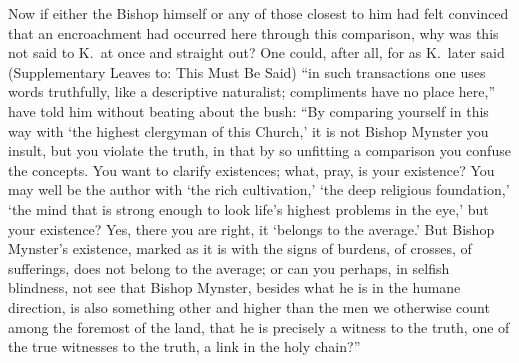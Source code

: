\documentclass[12pt,a4paper]{article}
\newcommand{\opage}[1]{\marginnote{\footnotesize\textit{[#1]}}}
\begin{document}
Now if either the Bishop himself or any of those closest to him had felt
convinced that an encroachment had occurred here through this
comparison, why was this not said to K.\ at once and straight out? One
could, after all, for as K.\ later said (Supplementary Leaves to: This Must Be
Said) ``in such transactions one uses words truthfully, like a
descriptive naturalist; compliments have no place here,'' have told him
without beating about the bush: ``By comparing yourself in this way with
`the highest clergyman of this Church,' it is not Bishop Mynster you
insult, but you violate the truth, in that by so unfitting a comparison
you confuse the concepts. You want to clarify existences; what, pray, is
your existence? You may well be the author with `the rich cultivation,'
`the deep religious foundation,' `the mind that is strong enough to look
life's highest problems in the eye,' but your existence? Yes, there you
are right, it `belongs to the average.' But Bishop Mynster's existence,
marked as it is with the signs of burdens, of crosses, of sufferings,
does not belong to the average; or can you perhaps, in selfish
blindness, not see that Bishop Mynster, besides what he is in the humane
direction, is also something other and higher than the men we otherwise
count among the foremost of the land, that he
\opage{20}is precisely a witness to the truth, one of the true witnesses to the truth,
a link in the holy chain?''
\end{document}
